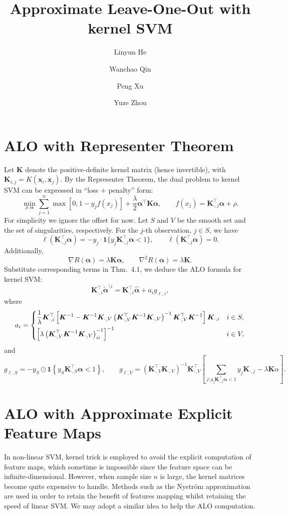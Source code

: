 \documentclass[11pt]{article}
\title{Approximate Leave-One-Out with kernel SVM}
\author{Linyun He \and Wanchao Qin \and Peng Xu \and Yuze Zhou}
\newcommand{\bx}{\bm{x}}
\newcommand{\bK}{\bm{K}}
\newcommand{\balpha}{\bm{\alpha}}
\newcommand{\refthm}[2]{#1~#2}
\begin{document}
\maketitle

\section{ALO with Representer Theorem}
Let \(\bK\) denote the positive-definite kernel matrix (hence invertible), with \(\bK_{i,j}=K(\bx_i,\bx_j)\). By the Representer Theorem, the dual problem to kernel SVM can be expressed in ``loss \(+\) penalty'' form:
\begin{equation}
\min_{\rho,\balpha}\sum_{j=1}^{n}\max\left[0, 1-y_jf(x_j)\right]+\frac{\lambda}{2}\balpha^\top\bK\balpha, \qquad f(x_j)=\bK_{\cdot,j}^\top\balpha+\rho.
\end{equation}
For simplicity we ignore the offset for now. Let \(S\) and \(V\) be the smooth set and the set of singularities, respectively. For the \(j\)-th observation, \(j\in S\), we have \[\dot{\ell}(\bK_{\cdot,j}^\top\balpha)=-y_j\cdot\bm{1}\{y_j\bK_{\cdot,j}^\top\balpha<1\},\qquad\ddot{\ell}(\bK_{\cdot,j}^\top\balpha)=0.\] Additionally, \[\nabla R(\balpha)=\lambda\bK\balpha,\qquad\nabla^2R(\balpha)=\lambda\bK.\] Substitute corresponding terms in \refthm{Thm.}{4.1}, we deduce the ALO formula for kernel SVM: \[\bK_{\cdot,i}^\top\tilde{\balpha}^{\setminus i}=\bK_{\cdot,i}^\top\hat{\balpha}+a_ig_{\ell,i},\] where \[a_i=\begin{dcases}
\frac{1}{\lambda}\bK_{\cdot,i}^\top\left[\bK^{-1}-\bK^{-1}\bK_{\cdot,V}\left(\bK_{\cdot,V}^\top\bK^{-1}\bK_{\cdot,V}\right)^{-1}\bK_{\cdot,V}^\top\bK^{-1}\right]\bK_{\cdot,i} & i\in S,\\
\left[\lambda\left(\bK_{\cdot,V}^\top\bK^{-1}\bK_{\cdot,V}\right)^{-1}_{ii}\right]^{-1} & i\in V,
\end{dcases}\] and \[g_{\ell, S}=-y_S\odot\bm{1}\left\{y_S\bK_{\cdot,S}^\top\balpha<1\right\},\qquad g_{\ell, V}=\left(\bK_{\cdot,V}^\top\bK_{\cdot,V}\right)^{-1}\bK_{\cdot,V}^\top\left[\sum_{j:y_j\bK_{\cdot,j}^\top\balpha<1}y_j\bK_{\cdot,j}-\lambda\bK\alpha\right].\]

\section{ALO with Approximate Explicit Feature Maps}
In non-linear SVM, kernel trick is employed to avoid the explicit computation of feature maps, which sometime is impossible since the feature space can be infinite-dimensional. However, when sample size \(n\) is large, the kernel matrices become quite expensive to handle. Methods such as the Nystr\"{o}m approximation are used in order to retain the benefit of features mapping whilst retaining the speed of linear SVM. We may adopt a similar idea to help the ALO computation.
\end{document}

